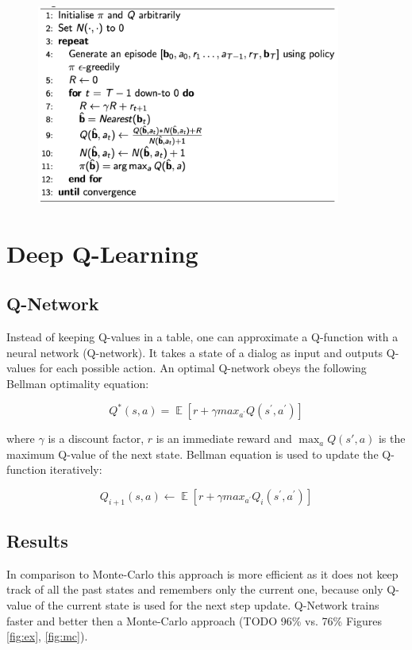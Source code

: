 \documentclass[12pt,titlepage,a4paper]{article}
\DeclareMathOperator*{\E}{\mathbb{E}}
\begin{document}
\begin{figure}[!h]
    \centering
    \includegraphics[width=10cm]{MCC.png}
    \caption{}
    \label{fig:MCC}
\end{figure}


\pagebreak


\section{Deep Q-Learning}

\subsection{Q-Network}
Instead of keeping Q-values in a table, one can approximate a Q-function with a neural network (Q-network). It takes a state of a dialog as input and outputs Q-values for each possible action. An optimal Q-network obeys the following Bellman optimality equation: 

\[ Q^*(s,a) = \E [r + \gamma max_{a^\prime}Q(s^\prime,a^\prime)] \] 

where $\gamma$ is a discount factor,  $r$ is an immediate reward and $\max_a Q(s',a)$ is the maximum Q-value of the next state. Bellman equation is used to update the Q-function iteratively:

\[Q_{i + 1} (s,a) \leftarrow \E[r + \gamma max_{a^\prime}Q_{i}(s^\prime,a^\prime)]\]

\subsection{Results}

In comparison to Monte-Carlo this approach is more efficient as it does not keep track of all the past states and remembers only the current one, because only Q-value of the current state is used for the next step update. Q-Network trains faster and better then a Monte-Carlo approach (TODO 96\% vs. 76\% Figures \ref{fig:ex}, \ref{fig:mc}). 
\end{document}
